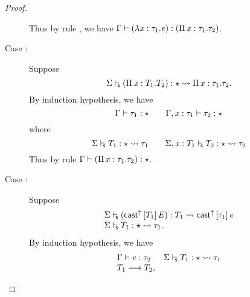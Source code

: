 \begin{proof}
\begin{description}
\[            \]
            Thus by rule , we have $\Gamma  \vdash  (  \lambda  \mathit{x}  :  \tau_{{\mathrm{1}}}  .  \mathit{e}  )  :  (  \Pi \, \mathit{x}  :  \tau_{{\mathrm{1}}}  .  \tau_{{\mathrm{2}}}  )$.
        \item[Case \ruleref{TR\_Pi}:] Suppose 
                \[  \Sigma  \vdash_{\!\!\mathsf{s} }  (  \Pi \, \mathit{x}  :  T_{{\mathrm{1}}}  .  T_{{\mathrm{2}}}  )  :  \star   \rightsquigarrow   \Pi \, \mathit{x}  :  \tau_{{\mathrm{1}}}  .  \tau_{{\mathrm{2}}} . \] 
            By induction hypothesis, we have 
            \[
                \Gamma  \vdash  \tau_{{\mathrm{1}}}  :  \star \qquad \Gamma  ,  \mathit{x}  :  \tau_{{\mathrm{1}}}  \vdash  \tau_{{\mathrm{2}}}  :  \star
            \]
            where
            \[
                 \Sigma  \vdash_{\!\!\mathsf{s} }  T_{{\mathrm{1}}}  :  \star   \rightsquigarrow   \tau_{{\mathrm{1}}}  \qquad  \Sigma  ,  \mathit{x}  :  T_{{\mathrm{1}}}  \vdash_{\!\!\mathsf{s} }  T_{{\mathrm{2}}}  :  \star   \rightsquigarrow   \tau_{{\mathrm{2}}} 
            \]
            Thus by rule  $\Gamma  \vdash  (  \Pi \, \mathit{x}  :  \tau_{{\mathrm{1}}}  .  \tau_{{\mathrm{2}}}  )  :  \star$.
        \item[Case \ruleref{TR\_CastUp}:] Suppose 
            \[\begin{array}{l}
                 \Sigma  \vdash_{\!\!\mathsf{s} }  (  \mathsf{cast}^{\uparrow} \, [  T_{{\mathrm{1}}}  ] \,  \mathit{E}  )  :  T_{{\mathrm{1}}}   \rightsquigarrow   \mathsf{cast}^{\uparrow} \, [  \tau_{{\mathrm{1}}}  ] \,  \mathit{e}  \\
                 \Sigma  \vdash_{\!\!\mathsf{s} }  T_{{\mathrm{1}}}  :  \star   \rightsquigarrow   \tau_{{\mathrm{1}}} .
            \end{array}\]
            By induction hypothesis, we have 
                \[
                \begin{array}{ll}
                \Gamma  \vdash  \mathit{e}  :  \tau_{{\mathrm{2}}} &
                 \Sigma  \vdash_{\!\!\mathsf{s} }  T_{{\mathrm{1}}}  :  \star   \rightsquigarrow   \tau_{{\mathrm{1}}}  \\
                T_{{\mathrm{1}}}  \longrightarrow  T_{{\mathrm{2}}}, &
                \end{array}
                \]

\end{description}
\end{proof}
